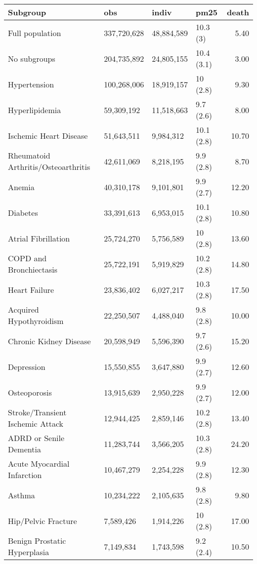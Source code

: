 \begin{table}[ht]
\centering
\begin{tabular}{llllr}
  \hline
Subgroup & obs & indiv & pm25 & death \\ 
  \hline
Full population & 337,720,628 & 48,884,589 & 10.3 (3) & 5.40 \\ 
  No subgroups & 204,735,892 & 24,805,155 & 10.4 (3.1) & 3.00 \\ 
  Hypertension & 100,268,006 & 18,919,157 & 10 (2.8) & 9.30 \\ 
  Hyperlipidemia & 59,309,192 & 11,518,663 & 9.7 (2.6) & 8.00 \\ 
  Ischemic Heart Disease & 51,643,511 & 9,984,312 & 10.1 (2.8) & 10.70 \\ 
  Rheumatoid Arthritis/Osteoarthritis & 42,611,069 & 8,218,195 & 9.9 (2.8) & 8.70 \\ 
  Anemia & 40,310,178 & 9,101,801 & 9.9 (2.7) & 12.20 \\ 
  Diabetes & 33,391,613 & 6,953,015 & 10.1 (2.8) & 10.80 \\ 
  Atrial Fibrillation & 25,724,270 & 5,756,589 & 10 (2.8) & 13.60 \\ 
  COPD and Bronchiectasis & 25,722,191 & 5,919,829 & 10.2 (2.8) & 14.80 \\ 
  Heart Failure & 23,836,402 & 6,027,217 & 10.3 (2.8) & 17.50 \\ 
  Acquired Hypothyroidism & 22,250,507 & 4,488,040 & 9.8 (2.8) & 10.00 \\ 
  Chronic Kidney Disease & 20,598,949 & 5,596,390 & 9.7 (2.6) & 15.20 \\ 
  Depression & 15,550,855 & 3,647,880 & 9.9 (2.7) & 12.60 \\ 
  Osteoporosis & 13,915,639 & 2,950,228 & 9.9 (2.7) & 12.00 \\ 
  Stroke/Transient Ischemic Attack & 12,944,425 & 2,859,146 & 10.2 (2.8) & 13.40 \\ 
  ADRD or Senile Dementia & 11,283,744 & 3,566,205 & 10.3 (2.8) & 24.20 \\ 
  Acute Myocardial Infarction & 10,467,279 & 2,254,228 & 9.9 (2.8) & 12.30 \\ 
  Asthma & 10,234,222 & 2,105,635 & 9.8 (2.8) & 9.80 \\ 
  Hip/Pelvic Fracture & 7,589,426 & 1,914,226 & 10 (2.8) & 17.00 \\ 
  Benign Prostatic Hyperplasia & 7,149,834 & 1,743,598 & 9.2 (2.4) & 10.50 \\ 

\end{tabular}
\end{table}
